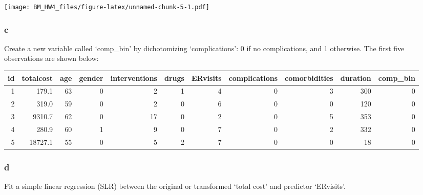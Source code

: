\documentclass[]{article}
\newenvironment{Shaded}{\begin{snugshade}}{\end{snugshade}}
\newcommand{\KeywordTok}[1]{\textcolor[rgb]{0.13,0.29,0.53}{\textbf{#1}}}
\newcommand{\DataTypeTok}[1]{\textcolor[rgb]{0.13,0.29,0.53}{#1}}
\newcommand{\DecValTok}[1]{\textcolor[rgb]{0.00,0.00,0.81}{#1}}
\newcommand{\StringTok}[1]{\textcolor[rgb]{0.31,0.60,0.02}{#1}}
\newcommand{\OtherTok}[1]{\textcolor[rgb]{0.56,0.35,0.01}{#1}}
\newcommand{\OperatorTok}[1]{\textcolor[rgb]{0.81,0.36,0.00}{\textbf{#1}}}
\newcommand{\NormalTok}[1]{#1}
\begin{document}
\texttt{[image: BM\_HW4\_files/figure-latex/unnamed-chunk-5-1.pdf]}

\subsubsection{c}\label{c-1}

Create a new variable called `comp\_bin' by dichotomizing
`complications': 0 if no complications, and 1 otherwise. The first five
observations are shown below:

\begin{Shaded}
\end{Shaded}

\begin{longtable}[]{@{}rrrrrrrrrrr@{}}
\toprule
id & totalcost & age & gender & interventions & drugs & ERvisits &
complications & comorbidities & duration & comp\_bin\tabularnewline
\midrule
\endhead
1 & 179.1 & 63 & 0 & 2 & 1 & 4 & 0 & 3 & 300 & 0\tabularnewline
2 & 319.0 & 59 & 0 & 2 & 0 & 6 & 0 & 0 & 120 & 0\tabularnewline
3 & 9310.7 & 62 & 0 & 17 & 0 & 2 & 0 & 5 & 353 & 0\tabularnewline
4 & 280.9 & 60 & 1 & 9 & 0 & 7 & 0 & 2 & 332 & 0\tabularnewline
5 & 18727.1 & 55 & 0 & 5 & 2 & 7 & 0 & 0 & 18 & 0\tabularnewline
\bottomrule
\end{longtable}

\subsubsection{d}\label{d}

Fit a simple linear regression (SLR) between the original or transformed
`total cost' and predictor `ERvisits'.
\end{document}
